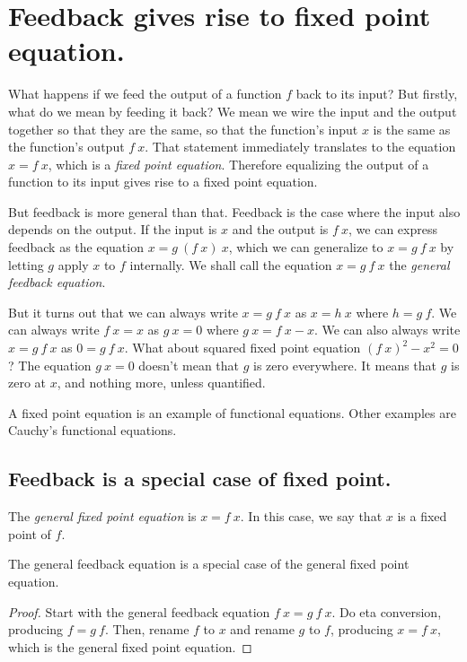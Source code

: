 \chapter{Feedback gives rise to fixed point equation.}

What happens if we feed the output
of a function \(f\) back to its input?
But firstly, what do we mean by feeding it back?
We mean we wire the input and the output together so that they are the same,
so that the function's input \(x\) is the same as the function's output \(f~x\).
That statement immediately translates to the equation \( x = f~x \),
which is a \emph{fixed point equation}.
Therefore equalizing the output of a function to its input gives rise to a fixed point equation.

But feedback is more general than that.
Feedback is the case where the input also depends on the output.
If the input is \(x\) and the output is \(f~x\),
we can express feedback as the equation \( x = g~(f~x)~x \),
which we can generalize to \( x = g~f~x \)
by letting \(g\) apply \(x\) to \(f\) internally.
We shall call the equation \( x = g~f~x \) the \emph{general feedback equation}.

But it turns out that we can always write \( x = g~f~x \) as \( x = h~x \)
where \( h = g~f \).
We can always write \( f~x = x \) as \( g~x = 0 \) where \( g~x = f~x - x \).
We can also always write \( x = g~f~x \) as \( 0 = g~f~x \).
What about squared fixed point equation \( (f~x)^2 - x^2 = 0 \)?
The equation \( g~x = 0 \) doesn't mean that \(g\) is zero everywhere.
It means that \(g\) is zero at \(x\), and nothing more, unless quantified.

A fixed point equation is an example of functional equations.
Other examples are Cauchy's functional equations.

\section{Feedback is a special case of fixed point.}

The \emph{general fixed point equation} is \(x = f ~ x\).
In this case, we say that \(x\) is a fixed point of \(f\).

\begin{m:thm}
The general feedback equation is a special case of the general fixed point equation.
\begin{proof}
Start with the general feedback equation \( f ~ x = g ~ f ~ x \).
Do eta conversion, producing \( f = g ~ f \).
Then, rename \(f\) to \(x\) and rename \(g\) to \(f\),
producing \( x = f ~ x \),
which is the general fixed point equation.
\end{proof}
\end{m:thm}

